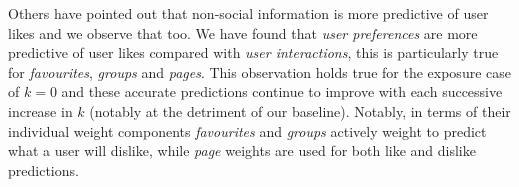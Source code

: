 Others have pointed out that non-social information is more predictive of user likes \cite{www} and we observe that too.
We have found that \emph{user preferences} are more predictive of user likes compared with \emph{user interactions}, this is particularly 
true for \emph{favourites}, \emph{groups} and \emph{pages}. This observation holds true for the exposure case of $k = 0$ and these accurate 
predictions continue to improve with each successive increase in $k$ (notably at the detriment of our baseline). Notably, in terms of their individual weight components
\emph{favourites} and \emph{groups} actively weight to predict what a user will dislike, while \emph{page} weights are used for 
both like and dislike predictions. 


